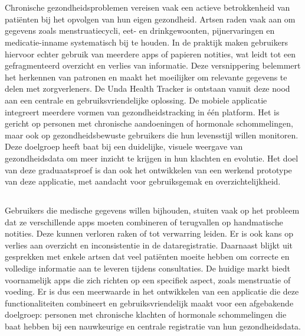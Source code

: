
\chapter{}%
\label{ch:inleiding}

Chronische gezondheidsproblemen vereisen vaak een actieve betrokkenheid van patiënten bij het opvolgen van hun eigen gezondheid. 
Artsen raden vaak aan om gegevens zoals menstruatiecycli, eet- en drinkgewoonten, pijnervaringen en medicatie-inname systematisch bij te houden. 
In de praktijk maken gebruikers hiervoor echter gebruik van meerdere apps of papieren notities, wat leidt tot een gefragmenteerd overzicht en verlies van informatie. 
Deze versnippering belemmert het herkennen van patronen en maakt het moeilijker om relevante gegevens te delen met zorgverleners. 
De Unda Health Tracker is ontstaan vanuit deze nood aan een centrale en gebruiksvriendelijke oplossing. De mobiele applicatie integreert meerdere vormen van gezondheidstracking in één platform. 
Het is gericht op personen met chronische aandoeningen of hormonale schommelingen, maar ook op gezondheidsbewuste gebruikers die hun levensstijl willen monitoren. 
Deze doelgroep heeft baat bij een duidelijke, visuele weergave van gezondheidsdata om meer inzicht te krijgen in hun klachten en evolutie. 
Het doel van deze graduaatsproef is dan ook het ontwikkelen van een werkend prototype van deze applicatie, met aandacht voor gebruiksgemak en overzichtelijkheid. 

\section{}%
\label{sec:probleemstelling}

Gebruikers die medische gegevens willen bijhouden, stuiten vaak op het probleem dat ze verschillende apps 
moeten combineren of terugvallen op handmatische notities. 
Deze kunnen verloren raken of tot verwarring leiden. 
Er is ook kans op verlies aan overzicht en inconsistentie in de dataregistratie. 
Daarnaast blijkt uit gesprekken met enkele artsen dat veel patiënten moeite hebben om correcte en volledige informatie aan te leveren tijdens consultaties. 
De huidige markt biedt voornamelijk apps die zich richten op een specifiek aspect, zoals menstruatie of voeding. 
Er is dus een meerwaarde in het ontwikkelen van een applicatie die deze functionaliteiten combineert 
en gebruiksvriendelijk maakt voor een afgebakende doelgroep: personen met chronische klachten of hormonale schommelingen die baat hebben bij 
een nauwkeurige en centrale registratie van hun gezondheidsdata. 

